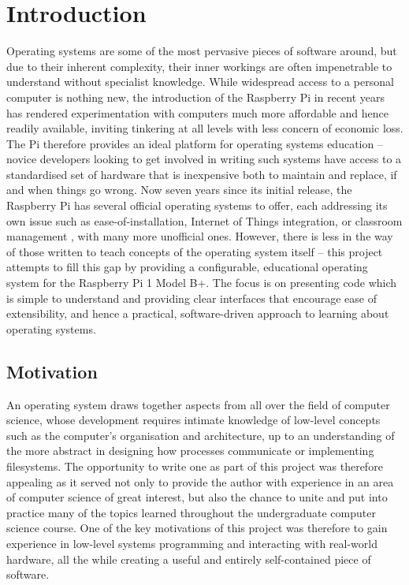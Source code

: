 \section{Introduction}
    Operating systems are some of the most pervasive pieces of software around,
    but due to their inherent complexity, their inner workings are often
    impenetrable to understand without specialist knowledge. While widespread
    access to a personal computer is nothing new, the introduction of the
    Raspberry Pi in recent years has rendered experimentation with computers
    much more affordable and hence readily available, inviting tinkering at all
    levels with less concern of economic loss. The Pi therefore provides an
    ideal platform for operating systems education -- novice developers looking
    to get involved in writing such systems have access to a standardised set of
    hardware that is inexpensive both to maintain and replace, if and when
    things go wrong. Now seven years since its initial release, the Raspberry
    Pi has several official operating systems to offer, each addressing its own
    issue such as ease-of-installation, Internet of Things integration, or
    classroom management \cite{OSes}, with many more unofficial ones. However,
    there is less in the way of those written to teach concepts of the operating
    system itself -- this project attempts to fill this gap by providing a
    configurable, educational operating system for the Raspberry Pi 1 Model B+.
    The focus is on presenting code which is simple to understand and providing
    clear interfaces that encourage ease of extensibility, and hence a
    practical, software-driven approach to learning about operating systems.

\subsection{Motivation}
    An operating system draws together aspects from all over the field of
    computer science, whose development requires intimate knowledge of low-level
    concepts such as the computer's organisation and architecture, up to an
    understanding of the more abstract in designing how processes communicate
    or implementing filesystems. The opportunity to write one as part of this
    project was therefore appealing as it served not only to provide the author
    with experience in an area of computer science of great interest,
    but also the chance to unite and put into practice many of the topics
    learned throughout the undergraduate computer science course. One of the key
    motivations of this project was therefore to gain experience in low-level
    systems programming and interacting with real-world hardware, all the while
    creating a useful and entirely self-contained piece of software.

